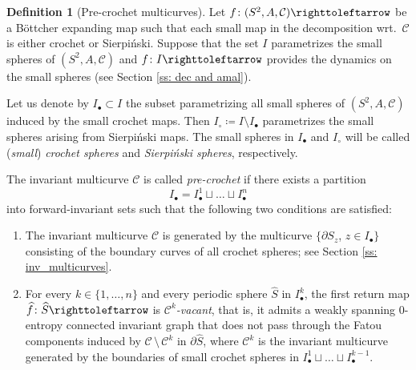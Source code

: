 \documentclass{amsart}
\theoremstyle{plain}
\theoremstyle{definition}
\newtheorem{definition}[theorem]{Definition}
\theoremstyle{remark}
\newcommand{\reminder}[1]{\textsl{$\lhd\rhd$#1$\lhd\rhd$}\marginpar{$\lhd\rhd\lhd\rhd\lhd\rhd$}}%
\newcommand{\hide}[1]{}
\newcommand{\CC}{{\mathcal C}}
\newcommand{\MC}{{\operatorname{MultiCurve}}}
\newcommand\selfmap{\righttoleftarrow}
\begin{document}
\begin{definition}[Pre-crochet multicurves]
\label{def:pre croch mult}
Let $f\colon (S^2, A, \CC)\selfmap$ be a B\"{o}ttcher expanding map such that each small map in the decomposition wrt.\ $\CC$ is either crochet or Sierpi\'{n}ski. Suppose that the set $I$ parametrizes the small spheres of $(S^2,A,\CC)$ and $f\colon I \selfmap$ provides the dynamics on the small spheres (see Section \ref{ss: dec and amal}). 

Let us denote by $I_\bullet \subset I$ the subset parametrizing all small spheres of $(S^2, A, \CC)$ induced by the small crochet maps. Then $I_\circ \coloneq I\setminus I_\bullet$ parametrizes the small spheres arising from Sierpi\'{n}ski maps. The small spheres in $I_\bullet$ and $I_\circ$ will be called (\emph{small}) \emph{crochet spheres} and \emph{Sierpi\'{n}ski spheres}, respectively.

The invariant multicurve $\CC$ is called \emph{pre-crochet} if there exists a partition 
\[I_\bullet = I^1_\bullet \sqcup \dots \sqcup I^n_\bullet\] into forward-invariant sets such that the following two conditions are satisfied:
\begin{enumerate}[label=\text{(\roman*)},font=\normalfont,leftmargin=*]
\item The invariant multicurve $\CC$ is generated by the multicurve $\{\partial S_z$, $z\in I_\bullet\}$ consisting of the boundary curves of all crochet spheres; see Section \ref{ss: inv_multicurves}. 
\item For every $k\in \{1,\dots, n\}$ and every periodic sphere $\widehat S$ in $I^k_\bullet$, the first return map $\widehat f\colon \widehat S \selfmap$ is \emph{$\CC^k$-vacant}, that is, it admits a weakly spanning $0$-entropy connected invariant graph that does not pass through the Fatou components induced by $\CC\,\setminus\, \CC^k$ in $\partial \widehat S$, where $\CC^k$ 
is the invariant multicurve generated by the boundaries of small crochet spheres in $I^1_\bullet\sqcup \dots \sqcup I^{k-1}_\bullet$. 
\end{enumerate}
\end{definition}
\end{document}
